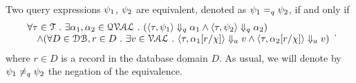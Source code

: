 \begin{defn}
%
\label{def:query_equal}
Two query expressions $\psi_1$, $\psi_2$ are equivalent, denoted as $\psi_1 =_{q} \psi_2$, if and only if
$$
 \begin{array}{l} 
   \forall \mathtt{\tau} \in \mathcal{T} ~.~ \exists \alpha_1, \alpha_2 \in \mathcal{QVAL} ~.~
    (\langle \mathtt{\tau},  \psi_1 \rangle \Downarrow_q \alpha_1 \land \langle \mathtt{\tau},  \psi_2  \rangle \Downarrow_q \alpha_2) 
    \\
    \quad \land (\forall D \in \mathcal{DB}, r \in D ~.~ 
    \exists v \in \mathcal{VAL} ~.~ 
          \langle \mathtt{\tau}, \alpha_1[r/\chi] \rangle \Downarrow_a v \land \langle \mathtt{\tau},  \alpha_2[r/\chi]  \rangle \Downarrow_a v)  
  \end{array}.
$$
 where $r \in D$ is a record in the database domain $D$. 
 As usual, we will denote by $\psi_1 \neq_{q} \psi_2$  the negation of the equivalence.
%
\end{defn}
